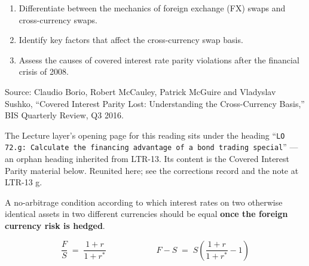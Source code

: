 
\begin{lrkeybox}
\begin{enumerate}[label=\textbf{\alph*.}]
\item Differentiate between the mechanics of foreign exchange (FX) swaps and cross-currency swaps.
\item Identify key factors that affect the cross-currency swap basis.
\item Assess the causes of covered interest rate parity violations after the financial crisis of 2008.
\end{enumerate}
{\footnotesize\color{FRMGrey}Source: Claudio Borio, Robert McCauley, Patrick McGuire and Vladyslav Sushko, ``Covered Interest Parity Lost: Understanding the Cross-Currency Basis,'' BIS Quarterly Review, Q3 2016.}
\end{lrkeybox}

\begin{lrtrapbox}
The Lecture layer's opening page for this reading sits under the heading ``\texttt{LO 72.g: Calculate the financing advantage of a bond trading special}'' --- an orphan heading inherited from LTR-13. Its content is the Covered Interest Parity material below. Reunited here; see the corrections record and the note at LTR-13 g.
\end{lrtrapbox}


\begin{lrdefbox}
A no-arbitrage condition according to which interest rates on two otherwise identical assets in two different currencies should be equal \textbf{once the foreign currency risk is hedged}.
\end{lrdefbox}

\begin{lrfmlbox}
\[ \frac{F}{S} \;=\; \frac{1+r}{1+r^{*}} \qquad\qquad\qquad F - S \;=\; S\left(\frac{1+r}{1+r^{*}} - 1\right) \]
\end{lrfmlbox}

